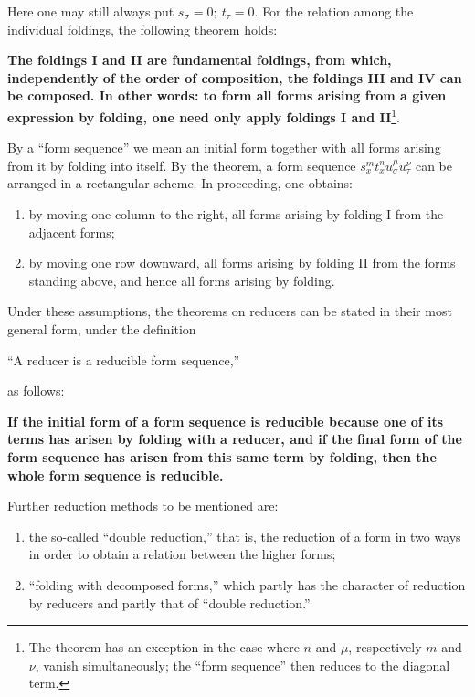 \documentclass[11pt]{article}
\begin{document}
Here one may still always put $s_\sigma=0;\ t_\tau=0$. For the relation among the individual foldings, the following theorem holds:

\textbf{The foldings I and II are fundamental foldings, from which, independently of the order of composition, the foldings III and IV can be composed. In other words: to form all forms arising from a given expression by folding, one need only apply foldings I and II}\footnote{The theorem has an exception in the case where $n$ and $\mu$, respectively $m$ and $\nu$, vanish simultaneously; the ``form sequence'' then reduces to the diagonal term.}.

By a ``form sequence'' we mean an initial form together with all forms arising from it by folding into itself. By the theorem, a form sequence $s_x^m t_x^n u_\sigma^\mu u_\tau^\nu$ can be arranged in a rectangular scheme. In proceeding, one obtains:
\begin{enumerate}
\item by moving one column to the right, all forms arising by folding I from the adjacent forms;
\item by moving one row downward, all forms arising by folding II from the forms standing above, and hence all forms arising by folding.
\end{enumerate}

Under these assumptions, the theorems on reducers can be stated in their most general form, under the definition
\begin{center}
``A reducer is a reducible form sequence,''
\end{center}
as follows:

\begin{center}
\textbf{If the initial form of a form sequence is reducible because one of its terms has arisen by folding with a reducer, and if the final form of the form sequence has arisen from this same term by folding, then the whole form sequence is reducible.}
\end{center}

Further reduction methods to be mentioned are:
\begin{enumerate}
\item the so-called ``double reduction,'' that is, the reduction of a form in two ways in order to obtain a relation between the higher forms;
\item ``folding with decomposed forms,'' which partly has the character of reduction by reducers and partly that of ``double reduction.''
\end{enumerate}
\clearpage
\end{document}
